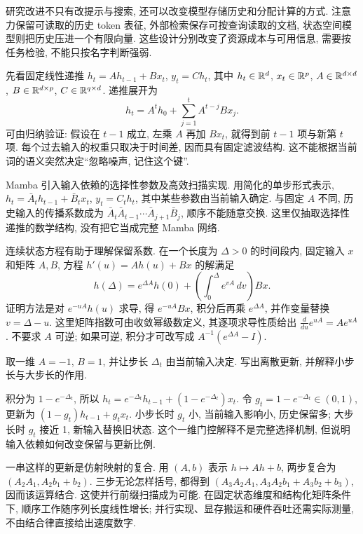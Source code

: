 研究改进不只有改提示与搜索, 还可以改变模型存储历史和分配计算的方式. 注意力保留可读取的历史 token 表征, 外部检索保存可按查询读取的文档, 状态空间模型则把历史压进一个有限向量. 这些设计分别改变了资源成本与可用信息, 需要按任务检验, 不能只按名字判断强弱.

先看固定线性递推 $h_t=Ah_{t-1}+Bx_t$, $y_t=Ch_t$, 其中 $h_t\in\mathbb R^d$, $x_t\in\mathbb R^p$, $A\in\mathbb R^{d\times d}$, $B\in\mathbb R^{d\times p}$, $C\in\mathbb R^{q\times d}$. 递推展开为
\[
h_t=A^th_0+\sum_{j=1}^tA^{t-j}Bx_j.
\]
可由归纳验证: 假设在 $t-1$ 成立, 左乘 $A$ 再加 $Bx_t$, 就得到前 $t-1$ 项与新第 $t$ 项. 每个过去输入的权重只取决于时间差, 因而具有固定滤波结构. 这不能根据当前词的语义突然决定“忽略噪声, 记住这个键”.

Mamba 引入输入依赖的选择性参数及高效扫描实现\cite{mamba}. 用简化的单步形式表示, $h_t=\bar A_t h_{t-1}+\bar B_t x_t$, $y_t=C_t h_t$, 其中某些参数由当前输入确定. 与固定 $A$ 不同, 历史输入的传播系数成为 $\bar A_t\bar A_{t-1}\cdots\bar A_{j+1}\bar B_j$, 顺序不能随意交换. 这里仅抽取选择性递推的数学结构, 没有把它当成完整 Mamba 网络.

连续状态方程有助于理解保留系数. 在一个长度为 $\Delta>0$ 的时间段内, 固定输入 $x$ 和矩阵 $A,B$, 方程 $h'(u)=Ah(u)+Bx$ 的解满足
\[
h(\Delta)=e^{\Delta A}h(0)+\left(\int_0^\Delta e^{vA}\,dv\right)Bx.
\]
证明方法是对 $e^{-uA}h(u)$ 求导, 得 $e^{-uA}Bx$, 积分后再乘 $e^{\Delta A}$, 并作变量替换 $v=\Delta-u$. 这里矩阵指数可由收敛幂级数定义, 其逐项求导性质给出 $\frac d{du}e^{uA}=Ae^{uA}$. 不要求 $A$ 可逆; 如果可逆, 积分才可改写成 $A^{-1}(e^{\Delta A}-I)$.

\begin{example}
取一维 $A=-1$, $B=1$, 并让步长 $\Delta_t$ 由当前输入决定. 写出离散更新, 并解释小步长与大步长的作用.
\end{example}
\begin{solution}
积分为 $1-e^{-\Delta_t}$, 所以 $h_t=e^{-\Delta_t}h_{t-1}+(1-e^{-\Delta_t})x_t$. 令 $g_t=1-e^{-\Delta_t}\in(0,1)$, 更新为 $(1-g_t)h_{t-1}+g_tx_t$. 小步长时 $g_t$ 小, 当前输入影响小, 历史保留多; 大步长时 $g_t$ 接近 1, 新输入替换旧状态. 这个一维门控解释不是完整选择机制, 但说明输入依赖如何改变保留与更新比例.
\end{solution}

一串这样的更新是仿射映射的复合. 用 $(A,b)$ 表示 $h\mapsto Ah+b$, 两步复合为 $(A_2A_1,A_2b_1+b_2)$. 三步无论怎样括号, 都得到 $(A_3A_2A_1,A_3A_2b_1+A_3b_2+b_3)$, 因而该运算结合. 这使并行前缀扫描成为可能. 在固定状态维度和结构化矩阵条件下, 顺序工作随序列长度线性增长; 并行实现、显存搬运和硬件吞吐还需实际测量, 不由结合律直接给出速度数字.

